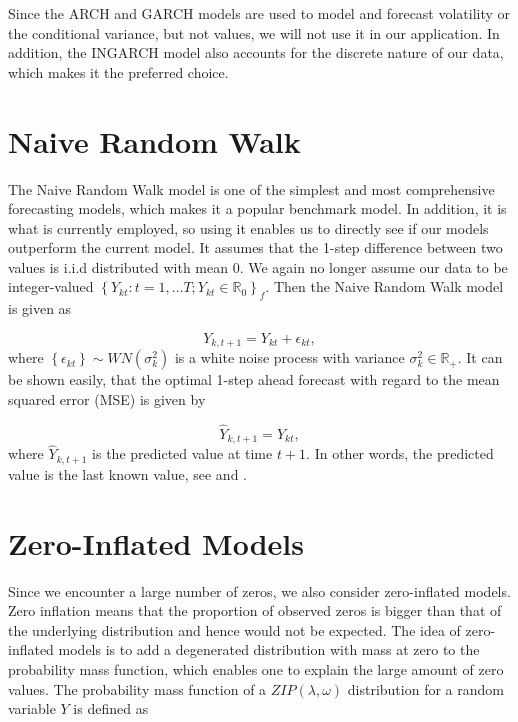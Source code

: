 Since the ARCH and GARCH models are used to model and forecast volatility or the conditional variance, but not values, we will not use it in our application. In addition, the INGARCH model also accounts for the discrete nature of our data, which makes it the preferred choice. 


\section{Naive Random Walk}
\label{sec: Naive Random Walk}

The Naive Random Walk model is one of the simplest and most comprehensive forecasting models, which makes it a popular benchmark model. In addition, it is what is currently employed, so using it enables us to directly see if our models outperform the current model. It assumes that the 1-step difference between two values is i.i.d distributed with mean 0. We again no longer assume our data to be integer-valued $\left\{Y_{kt}:t=1,\ldots T; Y_{kt} \in \mathbb{R}_0\right\}_f$. Then the Naive Random Walk model is given as

\begin{equation}
Y_{k,t+1}= Y_{kt} + \epsilon_{kt}, 
\label{eq: Random Walk Model}
\end{equation}
where $\left\{\epsilon_{kt}\right\} \sim WN(\sigma_k^2)$ is a white noise process with variance $\sigma_k^2 \in \mathbb{R}_+$. It can be shown easily, that the optimal 1-step ahead forecast with regard to the mean squared error (MSE) is given by

\begin{equation}
\hat{Y}_{k,t+1}= Y_{kt},
\label{eq: Random Walk Model Prediction}
\end{equation}
%
where $\hat{Y}_{k,t+1}$ is the predicted value at time $t+1$. In other words, the predicted value is the last known value, see \textcite{Nau:14} and \textcite{Scherrer:2021}.  


\section{Zero-Inflated Models}
\label{sec: Zim}

Since we encounter a large number of zeros, we also consider zero-inflated models. Zero inflation means that the proportion of observed zeros is bigger than that of the underlying distribution and hence would not be expected. The idea of zero-inflated models is to add a degenerated distribution with mass at zero to the probability mass function, which enables one to explain the large amount of zero values. The probability mass function of a $ZIP(\lambda,\omega)$ distribution for a random variable $Y$ is defined as

